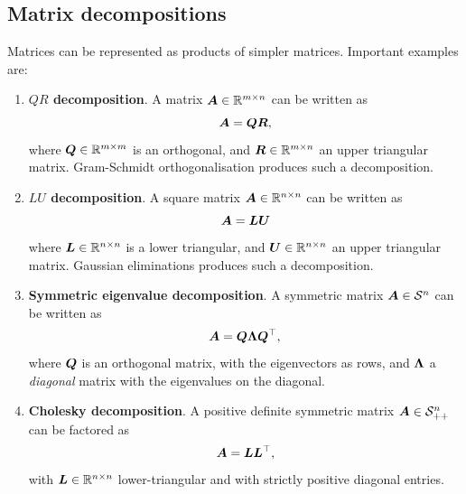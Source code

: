 \subsection{Matrix decompositions} Matrices can be represented as products of simpler matrices. Important examples are:
\begin{enumerate}
 \item {}\textbf{$QR$ decomposition}. A matrix $\bm{A}\in \mathbb{R}^{m\times n}$ can be written as
 \begin{equation*}
  \bm{A} = \bm{Q}\bm{R},
 \end{equation*}
where $\bm{Q}\in \mathbb{R}^{m\times m}$ is an orthogonal, and $\bm{R}\in \mathbb{R}^{m\times n}$ an upper triangular matrix. Gram-Schmidt orthogonalisation produces such a decomposition.
 \item {}\textbf{$LU$ decomposition}. A square matrix $\bm{A}\in \mathbb{R}^{n\times n}$ can be written as
 \begin{equation*}
  \bm{A} = \bm{L}\bm{U}
 \end{equation*}
where $\bm{L}\in \mathbb{R}^{n\times n}$ is a lower triangular, and $\bm{U}\in \mathbb{R}^{n\times n}$ an upper triangular matrix. Gaussian eliminations produces such a decomposition.
 \item {}\textbf{Symmetric eigenvalue decomposition}. A symmetric matrix $\bm{A}\in \mathcal{S}^n$ can be written as
 \begin{equation*}
  \bm{A} = \bm{Q}\bm{\Lambda} \bm{Q}^{\top},
 \end{equation*}
where $\bm{Q}$ is an orthogonal matrix, with the eigenvectors as rows, and $\bm{\Lambda}$ a {\em diagonal} matrix with the eigenvalues on the diagonal.
\item {}\textbf{Cholesky decomposition}. A positive definite symmetric matrix $\bm{A}\in \mathcal{S}_{++}^n$ can be factored as
\begin{equation*}
\bm{A} = \bm{L}\bm{L}^{\top},
\end{equation*}
with $\bm{L}\in \mathbb{R}^{n\times n}$ lower-triangular and with strictly positive diagonal entries.
\end{enumerate}

